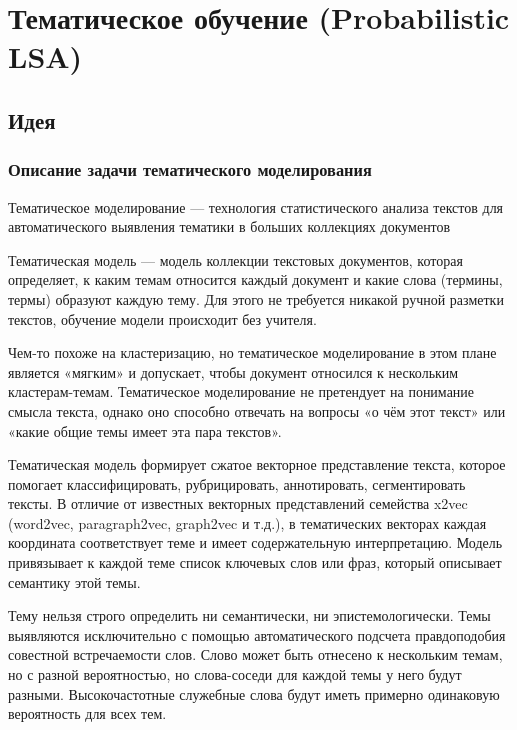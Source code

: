 \documentclass[10pt]{article}
\begin{document}
\section{Тематическое обучение  (Probabilistic LSA)}
\subsection{Идея}
\subsubsection*{Описание задачи тематического моделирования}

Тематическое моделирование --- технология статистического анализа текстов для автоматического выявления тематики в больших коллекциях документов

Тематическая модель --- модель коллекции текстовых документов, которая определяет, к каким темам относится каждый документ и какие слова (термины, термы) образуют каждую тему. Для этого не требуется никакой ручной разметки текстов, обучение модели происходит без учителя.

Чем-то похоже на кластеризацию, но тематическое моделирование в этом плане является «мягким» и допускает, чтобы документ относился к нескольким кластерам-темам. Тематическое моделирование не претендует на понимание смысла текста, однако оно способно отвечать на вопросы «о чём этот текст» или «какие общие темы имеет эта пара текстов».

Тематическая модель формирует сжатое векторное представление текста, которое помогает классифицировать, рубрицировать, аннотировать, сегментировать тексты. В отличие от известных векторных представлений семейства x2vec (word2vec, paragraph2vec, graph2vec и т.д.), в тематических векторах каждая координата соответствует теме и имеет содержательную интерпретацию. Модель привязывает к каждой теме список ключевых слов или фраз, который описывает семантику этой темы.

Тему нельзя строго определить ни семантически, ни эпистемологически. Темы выявляются исключительно с помощью автоматического подсчета правдоподобия совестной встречаемости слов. Слово может быть отнесено к нескольким темам, но с разной вероятностью, но слова-соседи для каждой темы у него будут разными. Высокочастотные служебные слова будут иметь примерно одинаковую вероятность для всех тем.
\end{document}
